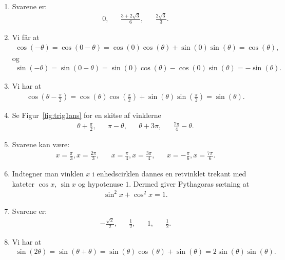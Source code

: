 \begin{enumerate}
	  
\item Svarene er:
\begin{align*}
0,&& \frac{3+2\sqrt{3}}{6},&& \frac{2\sqrt{3}}{3}.
\end{align*}
	
	\item Vi får at
	\begin{align*}
	\cos(-\theta)=\cos(0-\theta)=\cos(0)\cos(\theta)+\sin(0)\sin(\theta)=\cos(\theta),
	\end{align*}
	og 
	\begin{align*}
	\sin(-\theta)=\sin(0-\theta)=\sin(0)\cos(\theta)- \cos(0)\sin(\theta)=-\sin(\theta).
	\end{align*}
	
	\item Vi har at
	\begin{align*}
	\cos(\theta-\frac{\pi}{2})=\cos(\theta)\cos(\frac{\pi}{2})+\sin(\theta)\sin(\frac{\pi}{2})=\sin(\theta).
	\end{align*}
	  
	  	\item \label{it:trig1ans} Se Figur~\ref{fig:trig1ans} for en skitse af vinklerne
	  \begin{align*}
	  \theta+ \frac{\pi}{2},&& \pi-\theta,&& \theta +3\pi,&& \frac{7\pi}{4}-\theta.
	  \end{align*}

	 
	 \item Svarene kan være:
	 \begin{align*}
	 x=\frac{\pi}{3},x=\frac{2\pi}{3},&& x=\frac{\pi}{4},x=\frac{3\pi}{4},&& x=-\frac{\pi}{6},x=\frac{7\pi}{6}.
	 \end{align*}

	\item Indtegner man vinklen $x$ i enhedscirklen dannes en retvinklet trekant med kateter $\cos x$, $\sin x$ og hypotenuse $1$. Dermed giver Pythagoras sætning at
	\begin{align*}
	\sin^2x+\cos^2x=1.
	\end{align*}

	\item Svarene er:
	\begin{align*}
	-\frac{\sqrt{2}}{2},&& \frac{1}{2},&&1,&& \frac{1}{2}.
	\end{align*}
	
	\item\label{it:trig2ans} Vi har at 
	\begin{align*}
	\sin(2\theta)=\sin(\theta+\theta)=\sin(\theta)\cos(\theta)+\sin(\theta)=2\sin(\theta)\sin(\theta).
	\end{align*}


\end{enumerate}
